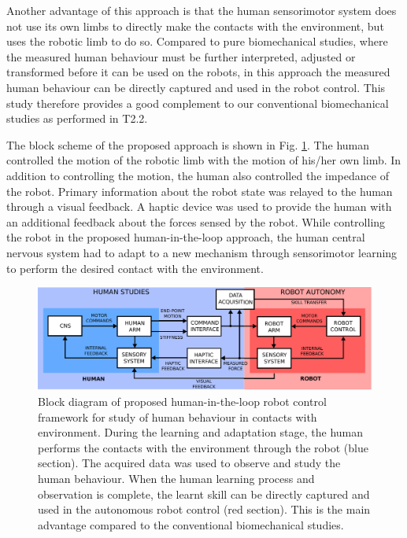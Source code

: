 Another advantage of this approach is that the human sensorimotor system does not use its own limbs to directly make the contacts with the environment, but uses the robotic limb to do so. Compared to pure biomechanical studies, where the measured human behaviour must be further interpreted, adjusted or transformed before it can be used on the robots, in this approach the measured human behaviour can be directly captured and used in the robot control. This study therefore provides a good complement to our conventional biomechanical studies as performed in T2.2.

The block scheme of the proposed approach is shown in Fig. \ref{fig:scheme}. The human controlled the motion of the robotic limb with the motion of his/her own limb. In addition to controlling the motion, the human also controlled the impedance of the robot. Primary information about the robot state was relayed to the human through a visual feedback. A haptic device was used to provide the human with an additional feedback about the forces sensed by the robot. While controlling the robot in the proposed human-in-the-loop approach, the human central nervous system had to adapt to a new mechanism through sensorimotor learning to perform the desired contact with the environment.
\begin{figure}[!t]
  \centering
  \includegraphics[width=\linewidth]{images/scheme.pdf}
  \caption{Block diagram of proposed human-in-the-loop robot control framework for study of human behaviour in contacts with environment. During the learning and adaptation stage, the human performs the contacts with the environment through the robot (blue section). The acquired data was used to observe and study the human behaviour. When the human learning process and observation is complete, the learnt skill can be directly captured and used in the autonomous robot control (red section). This is the main advantage compared to the conventional biomechanical studies.}
  \label{fig:scheme}
\end{figure}

